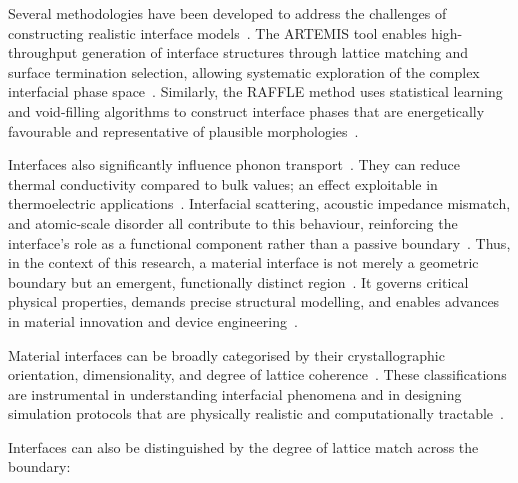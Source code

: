 Several methodologies have been developed to address the challenges of constructing realistic interface models~\nocite{}.
The ARTEMIS tool enables high-throughput generation of interface structures through lattice matching and surface termination selection, allowing systematic exploration of the complex interfacial phase space~\cite{Taylor2020-nl}.
Similarly, the RAFFLE method uses statistical learning and void-filling algorithms to construct interface phases that are energetically favourable and representative of plausible morphologies~\cite{raffle_paper}.

Interfaces also significantly influence phonon transport~\cite{Khot2025-hh}.
They can reduce thermal conductivity compared to bulk values; an effect exploitable in thermoelectric applications~\cite{flores2012_interfaces}.
Interfacial scattering, acoustic impedance mismatch, and atomic-scale disorder all contribute to this behaviour, reinforcing the interface's role as a functional component rather than a passive boundary~\cite{Hepplestone2010-vw}.
Thus, in the context of this research, a material interface is not merely a geometric boundary but an emergent, functionally distinct region~\nocite{}.
It governs critical physical properties, demands precise structural modelling, and enables advances in material innovation and device engineering~\nocite{}.

\newpage \label{interface_classification} Material interfaces can be broadly categorised by their crystallographic orientation, dimensionality, and degree of lattice coherence~\nocite{}.
These classifications are instrumental in understanding interfacial phenomena and in designing simulation protocols that are physically realistic and computationally tractable~\cite{Leung2020-tv, Di_Liberto2022-gz, Gerber2023-yd}.

\label{interface_coherence} Interfaces can also be distinguished by the degree of lattice match across the boundary:~\nocite{} %


